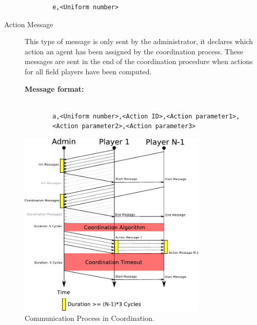 \begin{description}
\begin{description}
\begin{verbatim}
  e,<Uniform number>
  \end{verbatim}
\end{description}
\item[Action Message]
This type of message is only sent by the administrator, it declares which action an agent has been assigned by the coordination process. These messages are sent in the end of the coordination procedure when actions for all field players have been computed.
\begin{description}
  \item[{\bf Message format:}]
  \begin{verbatim}
  
  a,<Uniform number>,<Action ID>,<Action parameter1>,
  <Action parameter2>,<Action parameter3>
  \end{verbatim}
\end{description}

\end{description}

\begin{figure}[htb!]
\centering
  \includegraphics[width=0.8\textwidth]{Chapter4/figures/CoordComm.pdf}
  \caption{Communication Process in Coordination.} 
  \label{fig:coordinationprocess}
\end{figure}

